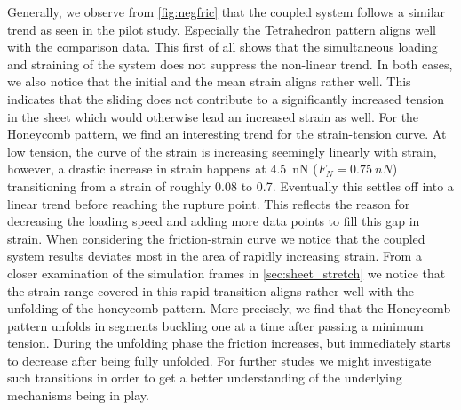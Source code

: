 Generally, we observe from \cref{fig:negfric} that the coupled system follows a
similar trend as seen in the pilot study. Especially the Tetrahedron pattern
aligns well with the comparison data. This first of all shows that the
simultaneous loading and straining of the system does not suppress the
non-linear trend. In both cases, we also notice that the initial and the mean
strain aligns rather well. This indicates that the sliding does not contribute
to a significantly increased tension in the sheet which would otherwise lead an increased strain as well. For the Honeycomb pattern, we find an
interesting trend for the strain-tension curve. At low tension, the curve of the
strain is increasing seemingly linearly with strain, however, a drastic increase
in strain happens at \SI{4.5}{nN} ($F_N = \SI{0.75}{nN}$) transitioning from a
strain of roughly 0.08 to 0.7. Eventually this settles off into a linear trend
before reaching the rupture point. This reflects the reason for decreasing the loading speed and adding more data points to fill this gap in strain. When considering the friction-strain curve we notice that the coupled system results deviates most in the area of rapidly increasing strain. From a closer examination of the simulation frames in \cref{sec:sheet_stretch} we
notice that the strain range covered in this rapid transition aligns rather well
with the unfolding of the honeycomb pattern. More precisely, we find that the
Honeycomb pattern unfolds in segments buckling one at a time after passing a
minimum tension. During the unfolding phase the friction increases, but immediately starts to decrease after being fully unfolded. For further studes we might investigate such transitions in order to get a better understanding of the underlying mechanisms being in play.

